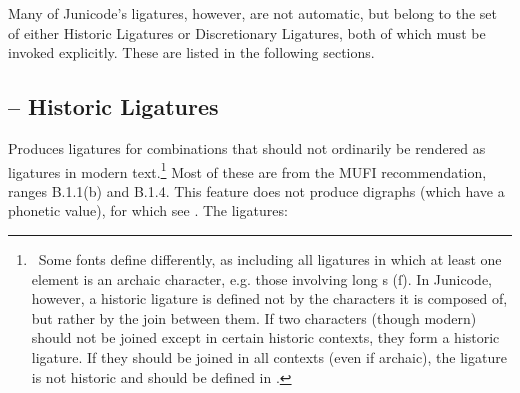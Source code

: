 Many of Junicode’s
ligatures, however, are not automatic, but belong to the set of either Historic Ligatures
or Discretionary Ligatures, both of which must be invoked explicitly. These are listed in the following sections.

\subsection{ – Historic Ligatures}

Produces ligatures for combinations that should not ordinarily be rendered as
ligatures in modern text.\footnote{\ Some
fonts define  differently, as including all ligatures in which at least one
element is an archaic character, e.g.
those involving long s (\textrm{ſ\hspace{0.2em}}). In Junicode, however, a
historic ligature is defined not by the characters it is composed of, but
rather by the join between them. If two characters (though modern) should not be joined except
in certain historic contexts, they form a historic ligature. If they should be
joined in all contexts (even if archaic), the ligature is not historic
and should be defined in .} Most of these are from the MUFI recommendation,
ranges B.1.1(b) and B.1.4. This feature does
not produce digraphs (which have a phonetic value), for which see
. The ligatures:

